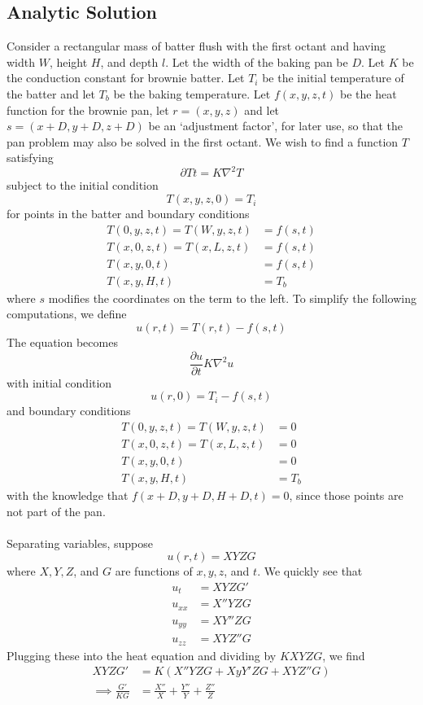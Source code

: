 \documentclass[12pt]{reedmcm}
\begin{document}
\subsection{Analytic Solution} 
Consider a rectangular mass of batter flush with the first octant and having width $W$, height $H$, and depth $l$.  Let the width of the baking pan be $D$.  Let $K$ be the conduction constant for brownie batter.  Let $T_i$ be the initial temperature of the batter and let $T_b$ be the baking temperature.  Let $f(x,y,z,t)$ be the heat function for the brownie pan, let $r = (x,y,z)$ and let $s = (x + D, y+D, z+D)$ be an `adjustment factor', for later use, so  that the pan problem may also be solved in the first octant.  We wish to find a function $T$ satisfying
\[\partial{T}{t} = K \nabla^2 T\]
subject to the initial condition
\[T(x,y,z,0) = T_i\]
for points in the batter and boundary conditions \begin{align*}
T(0,y,z,t) = T(W,y,z,t) &= f(s,t)\\
T(x,0,z,t) = T(x,L,z,t) &= f(s,t)\\
T(x,y,0,t) &= f(s,t)\\
T(x,y,H,t) &= T_b \end{align*}
where $s$ modifies the coordinates on the term to the left.
To simplify the following computations, we define
\[u(r,t) = T(r,t) - f(s,t)\]
The equation becomes 
\[\frac{\partial u}{\partial t} K \nabla^2 u\]
with initial condition
\[u(r,0) = T_i - f(s,t)\]
and boundary conditions \begin{align*}
T(0,y,z,t) = T(W,y,z,t) &= 0\\
T(x,0,z,t) = T(x,L,z,t) &= 0\\
T(x,y,0,t) &= 0\\
T(x,y,H,t) &= T_b\end{align*}
with the knowledge that $f(x+D, y+D, H+D, t) = 0$, since those points are not part of the pan.\\
\\
Separating variables, suppose
\[u(r,t) = XYZG\]
where $X,Y,Z$, and $G$ are functions of $x,y,z$, and $t$.  We quickly see that \begin{align*}
u_t &= XYZG'\\
u_{xx} &= X''YZG\\
u_{yy} &= XY''ZG\\
u_{zz} &= XYZ''G \end{align*}
Plugging these into the heat equation and dividing by $KXYZG$, we find \begin{align*}
XYZG' &= K(X''YZG +XyY'ZG + XYZ''G)\\
\implies \frac{G'}{KG}  &= \frac{X''}{X} + \frac{Y''}{Y} + \frac{Z''}{Z} \end{align*}
\end{document}
